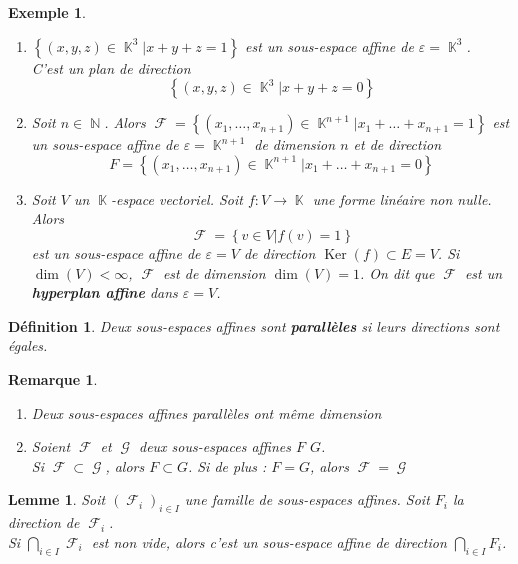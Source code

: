 \documentclass[a4paper, oneside]{report}
\theoremstyle{break}
\newtheorem{lemme}[thm]{Lemme}
\newtheorem{definition}[thm]{Définition}
\newtheorem{exemple}[thm]{Exemple}
\newtheorem{remarque}[thm]{Remarque}
\DeclareMathOperator{\N}{\mathbb{N}}
\DeclareMathOperator{\K}{\mathbb{K}}
\DeclareMathOperator{\F}{\mathcal{F}}
\DeclareMathOperator{\G}{\mathcal{G}}
\DeclarePairedDelimiter\ens{\left\{ }{\right\} }%
\DeclareMathOperator{\Ker}{Ker}
\renewcommand{\ens}[1]{\left\{ #1 \right\} }%
\newcommand{\slign}{\textbf}
\newcommand{\Ens}{\ens}
\newcommand{\ensF}{\F}
\newcommand{\ensG}{\G}
\begin{document}
\begin{exemple}
\begin{enumerate}
\item  $\Ens{(x, y, z) \in \K^3 \big| x + y + z = 1}$ est un sous-espace affine de $\varepsilon = \K^3$.\\
C'est un plan de direction
\[
\Ens{(x, y, z) \in \K^3 \big| x + y + z = 0}
\]

\item  Soit $n \in \N$. Alors $\ensF = \Ens{(x_1, \ldots, x_{n+1}) \in \K^{n+1} \big| x_1 + \ldots + x_{n+1} = 1}$ est un sous-espace affine de $\varepsilon = \K^{n+1}$ de dimension $n$ et de direction
\[
F = \Ens{(x_1, \ldots, x_{n+1}) \in \K^{n+1} \big| x_1 + \ldots + x_{n+1} = 0}
\]

\item  Soit $V$ un $\K$-espace vectoriel. Soit $f : V \longrightarrow \K$ une forme linéaire non nulle. Alors
\[
\ensF = \Ens{v \in V \big| f(v) = 1}
\]
est un sous-espace affine de $\varepsilon = V$ de direction $\Ker(f) \subset E = V$. Si $\dim(V) < \infty$, $\ensF$ est de dimension $\dim(V) = 1$. On dit que $\ensF$ est un \slign{hyperplan affine} dans $\varepsilon = V$.

\end{enumerate}
\end{exemple}

\begin{definition}
Deux sous-espaces affines sont \slign{parallèles} si leurs directions sont égales.
\end{definition}

\begin{remarque}
\begin{enumerate}
\item  Deux sous-espaces affines parallèles ont même dimension

\medbreak

\item  Soient $\ensF$ et $\ensG$ deux sous-espaces affines $F$ $G$.\\
Si $\ensF \subset \ensG$, alors $F \subset G$. Si de plus : $F = G$, alors $\ensF = \ensG$

\end{enumerate}
\end{remarque}

\begin{lemme}
Soit $(\ensF_i)_{i \in I}$ une famille de sous-espaces affines. Soit $F_i$ la direction de $\ensF_i$.\\
Si $\bigcap\limits_{i \in I} \ensF_i$ est non vide, alors c'est un sous-espace affine de direction $\bigcap\limits_{i \in I} F_i$.
\end{lemme}
\end{document}
